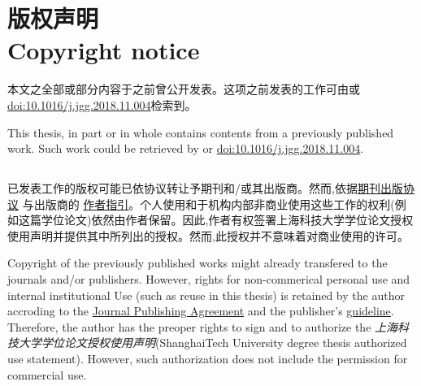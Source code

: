 
\chapter{版权声明 \\ Copyright notice}


本文之全部或部分内容于之前曾公开发表。这项之前发表的工作可由\citep{luo2019whole}或\href{https://doi.org/10.1016/j.jgg.2018.11.004}{doi:10.1016/j.jgg.2018.11.004}检索到。

This thesis, in part or in whole contains contents from a previously published work. Such work could be retrieved by \citep{luo2019whole} or \href{https://doi.org/10.1016/j.jgg.2018.11.004}{doi:10.1016/j.jgg.2018.11.004}.


\section*{} %
已发表工作的版权可能已依协议转让予期刊和/或其出版商。然而,依据\href{http://www.jgenetgenomics.org/fileup/JGG_publishing_agreement.pdf}{期刊出版协议} 与出版商的 \href{https://www.elsevier.com/journals/journal-of-genetics-and-genomics/16738527/guide-for-authors}{作者指引}。个人使用和于机构内部非商业使用这些工作的权利(例如这篇学位论文)依然由作者保留。因此,作者有权签署上海科技大学学位论文授权使用声明并提供其中所列出的授权。然而,此授权并不意味着对商业使用的许可。

Copyright of the previously published works might already transfered to the journals and/or publishers. However, rights for non-commerical personal use and internal institutional Use (such as reuse in this thesis) is retained by the author accroding to the \href{http://www.jgenetgenomics.org/fileup/JGG_publishing_agreement.pdf}{Journal Publishing Agreement} and the publisher's \href{https://www.elsevier.com/journals/journal-of-genetics-and-genomics/16738527/guide-for-authors}{guideline}. Therefore, the author has the preoper rights to sign and to authorize the \textit{上海科技大学学位论文授权使用声明}(ShanghaiTech University degree thesis authorized use statement). However, such authorization does not include the permission for commercial use.


